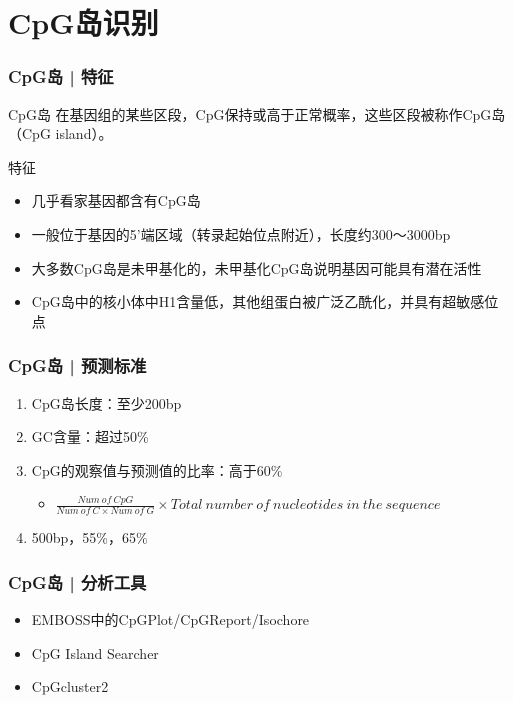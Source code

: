 \section{CpG岛识别}
\begin{frame}
	\frametitle{CpG岛 | 特征}
	\begin{block}{CpG岛}
		在基因组的某些区段，CpG保持或高于正常概率，这些区段被称作CpG岛（CpG island）。
	\end{block}
	\pause
	\begin{block}{特征}
		\begin{itemize}
			\item 几乎看家基因都含有CpG岛
			\item 一般位于基因的5'端区域（转录起始位点附近），长度约300～3000bp
			\item 大多数CpG岛是未甲基化的，未甲基化CpG岛说明基因可能具有潜在活性
			\item CpG岛中的核小体中H1含量低，其他组蛋白被广泛乙酰化，并具有超敏感位点
		\end{itemize}
	\end{block}
\end{frame}

\begin{frame}
	\frametitle{CpG岛 | 预测标准}
	\begin{enumerate}
		\item CpG岛长度：至少200bp
		\item GC含量：超过50\%
		\item CpG的观察值与预测值的比率：高于60\%
			\begin{itemize}
				\item $\frac{Num\ of\ CpG}{Num\ of\ C \times Num\ of\ G} \times Total\ number\ of\ nucleotides\ in\ the\ sequence$
			\end{itemize}
		\pause
		\item 500bp，55\%，65\%
	\end{enumerate}
\end{frame}

\begin{frame}
	\frametitle{CpG岛 | 分析工具}
	\begin{itemize}
		\item EMBOSS中的CpGPlot/CpGReport/Isochore
		\item CpG Island Searcher
		\item CpGcluster2
	\end{itemize}
\end{frame}

